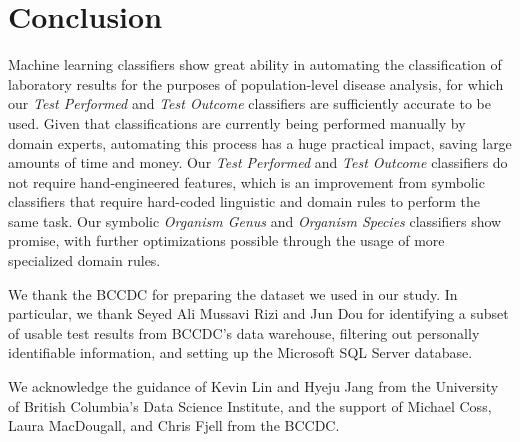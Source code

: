 \documentclass[sigconf]{acmart}
\begin{document}
\section{Conclusion}

Machine learning classifiers show great ability in automating the classification of laboratory results for the purposes of population-level disease analysis, for which our \textit{Test Performed} and \textit{Test Outcome} classifiers are sufficiently accurate to be used. Given that classifications are currently being performed manually by domain experts, automating this process has a huge practical impact, saving large amounts of time and money. Our \textit{Test Performed} and \textit{Test Outcome} classifiers do not require hand-engineered features, which is an improvement from symbolic classifiers that require hard-coded linguistic and domain rules to perform the same task. Our symbolic \textit{Organism Genus} and \textit{Organism Species} classifiers show promise, with further optimizations possible through the usage of more specialized domain rules.

\begin{acks}

We thank the BCCDC for preparing the dataset we used in our study. In particular, we thank Seyed Ali Mussavi Rizi and Jun Dou for identifying a subset of usable test results from BCCDC's data warehouse, filtering out personally identifiable information, and setting up the Microsoft SQL Server database.

We acknowledge the guidance of Kevin Lin and Hyeju Jang from the University of British Columbia's Data Science Institute, and the support of Michael Coss, Laura MacDougall, and Chris Fjell from the BCCDC.

\end{acks}



\end{document}
